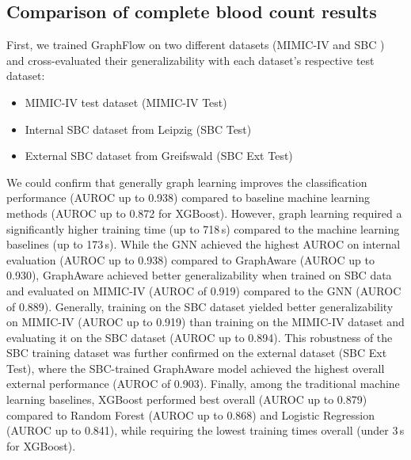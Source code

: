 \documentclass[pdflatex,sn-mathphys-num,lineno]{sn-jnl}
\theoremstyle{thmstyleone}%
\theoremstyle{thmstyletwo}%
\theoremstyle{thmstylethree}%
\begin{document}
\subsection{Comparison of complete blood count results}\label{res:cbc}                        
First, we trained GraphFlow on two different datasets (MIMIC-IV \cite{johnson2023mimic} and   
SBC \cite{steinbach2024applying}) and cross-evaluated their generalizability with each dataset's
respective test dataset:                                                                        
\begin{itemize}                                                                               
    \item MIMIC-IV test dataset (MIMIC-IV Test)                                               
    \item Internal SBC dataset from Leipzig (SBC Test)                                        
    \item External SBC dataset from Greifswald (SBC Ext Test)
\end{itemize}

We could confirm that generally graph learning improves the classification performance (AUROC up to 0.938) compared to baseline machine learning methods (AUROC up to 0.872 for XGBoost). However, graph learning required a significantly higher training time (up to 718\,s) compared to the machine learning baselines (up to 173\,s). While the GNN achieved the highest AUROC on internal evaluation (AUROC up to 0.938) compared to GraphAware (AUROC up to 0.930), GraphAware achieved better generalizability when trained on SBC data and evaluated on MIMIC-IV (AUROC of 0.919) compared to the GNN (AUROC of 0.889). Generally, training on the SBC dataset yielded better generalizability on MIMIC-IV (AUROC up to 0.919) than training on the MIMIC-IV dataset and evaluating it on the SBC dataset (AUROC up to 0.894). This robustness of the SBC training dataset was further confirmed on the external dataset (SBC Ext Test), where the SBC-trained GraphAware model achieved the highest overall external performance (AUROC of 0.903). Finally, among the traditional machine learning baselines, XGBoost performed best overall (AUROC up to 0.879) compared to Random Forest (AUROC up to 0.868) and Logistic Regression (AUROC up to 0.841), while requiring the lowest training times overall (under 3\,s for XGBoost).
\end{document}
